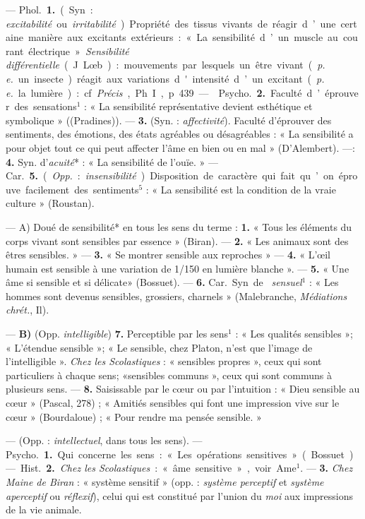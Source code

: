 \begin{itemize}[leftmargin=1cm, label=, itemsep=1pt]
 —  \si{Phol.} {\bf 1.} (Syn. : {\it
excitabilité} ou {\it irritabilité}). Propriété des tissus vivants de réagir
d’une certaine manière aux excitants extérieurs : « La sensibilité d’un
muscle au courant électrique ». {\it Sensibilité différentielle} (J. Lœb) :
mouvements par lesquels un être vivant ({\it p. e.} un insecte) réagit aux
variations d'intensité d’un excitant ({\it p. e.} la lumière) : cf.
{\it Précis}, Ph. I, p. 439.

—  \si{Psycho.} {\bf 2.} Faculté d’éprouver des
sensations$^1$ : « La sensibilité représentative devient esthétique et
symbolique » ((Pradines)). — {\bf 3.} (Syn. : {\it affectivité}). Faculté
d’éprouver des sentiments, des émotions, des états agréables ou
désagréables : « La sensibilité a pour objet tout ce qui peut affecter l’âme
en bien ou en mal » (D'Alembert). —: {\bf 4.} Syn. d'{\it acuité}* : « La
sensibilité de l’ouïe. » — \si{Car.} {\bf 5.} ({\it Opp.} :
{\it insensibilité}). Disposition de caractère qui fait qu’on éprouve
facilement des sentiments$^5$ : « La sensibilité est la condition de la vraie
culture » (Roustan).

 — A)  Doué de sensibilité* en tous les sens du
terme : {\bf 1.} « Tous les éléments du corps vivant sont sensibles par
essence » (Biran). —  {\bf 2.} « Les animaux sont des êtres sensibles. » —
{\bf 3.} « Se montrer sensible aux reproches » — {\bf 4.} « L’œil humain est
sensible à une variation de 1/150 en lumière blanche ». —  {\bf 5.} « Une âme
si sensible et si délicate» (Bossuet). — {\bf 6.} \si{Car.} Syn. de {\it
sensuel}$^1$ : « Les hommes sont devenus
sensibles, grossiers, charnels » (Malebranche, {\it Médiations chrét.}, Il).

— {\bf B)}  (Opp. {\it intelligible})  {\bf 7.} Perceptible
par les sens$^1$ : « Les qualités sensibles »; « L’étendue sensible »; « Le
sensible, chez Platon, n’est que l’image de l'intelligible ». {\it Chez les
Scolastiques} : « sensibles propres », ceux qui sont particuliers à chaque
sens; «sensibles communs », ceux qui sont communs à plusieurs sens. —
{\bf 8.} Saisissable par le cœur ou par l'intuition : « Dieu sensible au cœur
» (Pascal, 278) ; « Amitiés sensibles qui font une impression vive sur le
cœur » (Bourdaloue) ; « Pour rendre ma pensée sensible. »

 — (Opp. : {\it intellectuel}, dans tous les sens). —
\si{Psycho.} {\bf 1.} Qui concerne les sens : « Les opérations sensitives
» (Bossuet). — \si{Hist.} {\bf 2.} {\it Chez les Scolastiques} : « âme
sensitive », voir Ame$^1$. — {\bf 3.} {\it Chez Maine de Biran} : « système
sensitif » (opp. : {\it système perceptif} et {\it système aperceptif} ou
{\it réflexif}), celui qui est constitué par l’union du {\it moi} aux
impressions de la vie animale.


\end{itemize}
